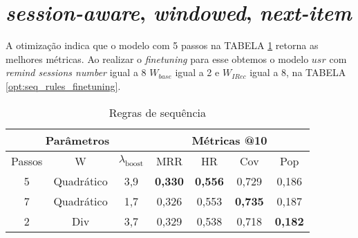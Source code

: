 \newpage




\section{\textit{session-aware}, \textit{windowed}, \textit{next-item}}

A otimização indica que o modelo com 5 passos na TABELA \ref{opt:seq_rules}
retorna as melhores métricas. Ao realizar o \textit{finetuning} para esse
obtemos o modelo $usr$ com \textit{remind sessions number} igual a 8 $W_{base}$
igual a 2 e $W_{IRec}$ igual a 8, na TABELA \ref{opt:seq_rules_finetuning}.

\begin{table}[htbp]
  \centering
  \begin{tabular}{|c|c|c|c|c|c|c|}
    \hline
      \multicolumn{3}{|c|}{Parâmetros} & \multicolumn{4}{c|}{Métricas @10} \\
      \hline
      Passos & W & $\lambda_{\text{boost}}$ & MRR & HR & Cov & Pop \\
      \hline
      5 & Quadrático & 3,9 & \textbf{0,330} & \textbf{0,556} & 0,729 & 0,186 \\
      \hline
      7 & Quadrático & 1,7 & 0,326 & 0,553 & \textbf{0,735} & 0,187 \\
      \hline
      2 & Div & 3,7 & 0,329 & 0,538 & 0,718 & \textbf{0,182} \\
      \hline
      \end{tabular}
      \caption{Regras de sequência}
      \label{opt:seq_rules}
\end{table}

